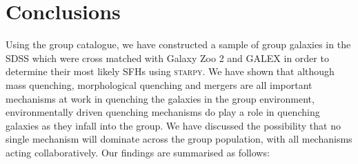 \documentclass[useAMS,usenatbib]{mn2e}
\begin{document}
\section{Conclusions}\label{sec:conc}

Using the \citet{berlind06} group catalogue, we have constructed a sample of group galaxies in the SDSS which were cross matched with Galaxy Zoo 2 and GALEX in order to determine their most likely SFHs using \textsc{starpy}. We have shown that although mass quenching, morphological quenching and mergers are all important mechanisms at work in quenching the galaxies in the group environment, environmentally driven quenching mechanisms do play a role in quenching galaxies as they infall into the group. We have discussed the possibility that no single mechanism will dominate across the group population, with all mechanisms acting collaboratively. Our findings are summarised as follows:
\end{document}
